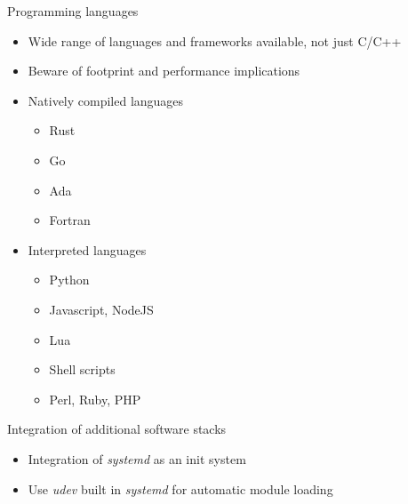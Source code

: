 \begin{frame}{Programming languages}
  \begin{itemize}
  \item Wide range of languages and frameworks available, not just C/C++
  \item Beware of footprint and performance implications
  \item Natively compiled languages
    \begin{itemize}
    \item Rust
    \item Go
    \item Ada
    \item Fortran
    \end{itemize}
  \item Interpreted languages
    \begin{itemize}
    \item Python
    \item Javascript, NodeJS
    \item Lua
    \item Shell scripts
    \item Perl, Ruby, PHP
    \end{itemize}
  \end{itemize}
\end{frame}

\setuplabframe
{Integration of additional software stacks}
{
  \begin{itemize}
  \item Integration of {\em systemd} as an init system
  \item Use {\em udev} built in {\em systemd} for automatic module
    loading
  \end{itemize}
}
